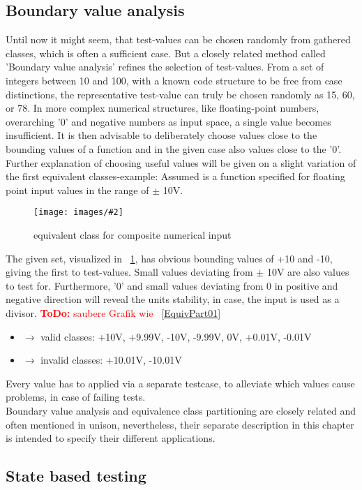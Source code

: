 \documentclass[master,english,smartquotes,apa]{hgbthesis}
\newcommand{\TODO}[1]{\textcolor{red}{\textbf{ToDo:} #1}}
\newcommand \bildGr[5]{\begin{figure}[#1]	\centering	\texttt{[image: images/\#2]}	\caption{#3}	\label{#4}	\end{figure}}
\begin{document}
	\subsection{Boundary value analysis} %
	Until now it might seem, that test-values can be chosen randomly from gathered classes, which is often a sufficient case. But a closely related method called 'Boundary value analysis' refines the selection of test-values. From a set of integers between 10 and 100, with a known code structure to be free from case distinctions, the representative test-value can truly be chosen randomly as 15, 60, or 78. In more complex numerical structures, like floating-point numbers, overarching '0' and negative numbers as input space, a single value becomes insufficient. It is then advisable to deliberately choose values close to the bounding values of a function and in the given case also values close to the '0'.
	Further explanation of choosing useful values will be given on a slight variation of the first equivalent classes-example: Assumed is a function specified for floating point input values in the range of $\pm$ 10V. 
			\bildGr{h!}{eqPart02}{equivalent class for composite numerical input}{eqPart02}{0.5\textwidth}
	The given set, visualized in ~\ref{eqPart02}, has obvious bounding values of +10 and -10, giving the first to test-values. Small values deviating from $\pm$ 10V are also values to test for. Furthermore, '0' and small values deviating from 0 in positive and negative direction will reveal the units stability, in case, the input is used as a divisor. \TODO{saubere Grafik wie ~\ref{EquivPart01}} \\
	\begin{itemize}[label={}]
		\item	$\rightarrow$ valid classes: +10V, +9.99V, -10V, -9.99V, 0V, +0.01V, -0.01V \\
		\item	$\rightarrow$ invalid classes: +10.01V, -10.01V \\
	\end{itemize}
	Every value has to applied via a separate testcase, to alleviate which values cause problems, in case of failing tests. \\
	Boundary value analysis and equivalence class partitioning are closely related and often mentioned in unison, nevertheless, their separate description in this chapter is intended to specify their different applications.
		
	\subsection{State based testing}
\end{document}
